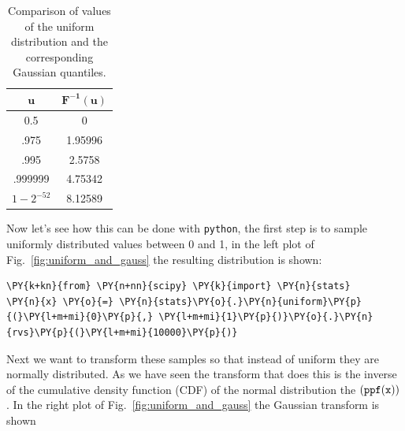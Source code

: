 \begin{table}[h]
  \centering
  \begin{tabular}{|c|c|}
    \hline
    \(\mathbf{u}\) & \(\mathbf{F^{-1}(u)}\) \\
    \hline
    0.5 & 0 \\
        \hline
        .975 & 1.95996 \\
            \hline
            .995 & 2.5758 \\
                \hline
                .999999 & 4.75342 \\
                    \hline
                    \(1-2^{-52}\) & 8.12589 \\
                        \hline
  \end{tabular}
  \caption{Comparison of values of the uniform distribution and the corresponding Gaussian quantiles.}
\label{tab:transformation}
\end{table}

Now let's see how this can be done with \texttt{python}, the first step is to sample
uniformly distributed values between 0 and 1, in the left plot of Fig.~\ref{fig:uniform_and_gauss} the resulting distribution is shown:

\begin{tcolorbox}[breakable, size=fbox, boxrule=1pt, pad at break*=1mm,colback=cellbackground, colframe=cellborder]
\begin{Verbatim}[commandchars=\\\{\}]
\PY{k+kn}{from} \PY{n+nn}{scipy} \PY{k}{import} \PY{n}{stats}
\PY{n}{x} \PY{o}{=} \PY{n}{stats}\PY{o}{.}\PY{n}{uniform}\PY{p}{(}\PY{l+m+mi}{0}\PY{p}{,} \PY{l+m+mi}{1}\PY{p}{)}\PY{o}{.}\PY{n}{rvs}\PY{p}{(}\PY{l+m+mi}{10000}\PY{p}{)}
\end{Verbatim}
\end{tcolorbox}

    Next we want to transform these samples so that instead of uniform they
are normally distributed. As we have seen the transform that does this
is the inverse of the cumulative density function (CDF) of the normal
distribution the \((\tt{ppf(x))}\). In the right plot of Fig.~\ref{fig:uniform_and_gauss} the Gaussian transform is shown

